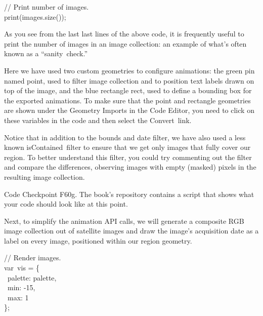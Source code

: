 \documentclass[
  letterpaper,
  DIV=11,
  numbers=noendperiod]{scrreprt}
\begin{document}
// Print number of images.\\
print(images.size());

As you see from the last last lines of the above code, it is frequently
useful to print the number of images in an image collection: an example
of what's often known as a ``sanity~check.''

Here we have used two custom geometries to configure animations: the
green pin named point, used to filter image collection and to position
text labels drawn on top of the image, and the blue rectangle rect, used
to define a bounding box for the exported animations. To make sure that
the point and rectangle geometries are shown under the Geometry Imports
in the Code Editor, you need to click on these variables in the code and
then select the Convert~link.

Notice that in addition to the bounds and date filter, we have also used
a less known isContained~filter to ensure that we get only images that
fully cover our region. To better understand this filter, you could try
commenting out the filter and compare the differences, observing images
with empty (masked) pixels in the resulting image collection.

\begin{tcolorbox}[enhanced jigsaw, left=2mm, breakable, rightrule=.15mm, opacityback=0, colframe=quarto-callout-note-color-frame, colbacktitle=quarto-callout-note-color!10!white, arc=.35mm, opacitybacktitle=0.6, toptitle=1mm, colback=white, leftrule=.75mm, title=\textcolor{quarto-callout-note-color}{\faInfo}\hspace{0.5em}{Note}, toprule=.15mm, bottomtitle=1mm, titlerule=0mm, bottomrule=.15mm, coltitle=black]

Code Checkpoint F60g. The book's repository contains a script that shows
what your code should look like at this point.

\end{tcolorbox}

Next, to simplify the animation API calls, we will generate a composite
RGB image collection out of satellite images and draw the image's
acquisition date as a label on every image, positioned within our region
geometry.

// Render images.\\
var~vis = \{\\
\hspace*{0.333em} ~palette: palette,\\
\hspace*{0.333em} ~min: -15,\\
\hspace*{0.333em} ~max: 1\\
\};
\end{document}
